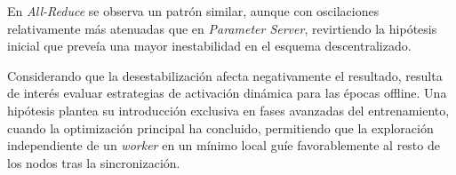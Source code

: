 En \emph{All-Reduce} se observa un patrón similar, aunque con oscilaciones relativamente más atenuadas que en \emph{Parameter Server}, revirtiendo la hipótesis inicial que preveía una mayor inestabilidad en el esquema descentralizado.

Considerando que la desestabilización afecta negativamente el resultado, resulta de interés evaluar estrategias de activación dinámica para las épocas offline. Una hipótesis plantea su introducción exclusiva en fases avanzadas del entrenamiento, cuando la optimización principal ha concluido, permitiendo que la exploración independiente de un \emph{worker} en un mínimo local guíe favorablemente al resto de los nodos tras la sincronización.

